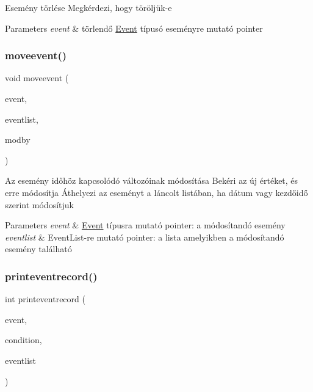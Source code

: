 Esemény törlése Megkérdezi, hogy töröljük-\/e 
\begin{DoxyParams}{Parameters}
{\em event} & törlendő \hyperlink{struct_event}{Event} típusó eseményre mutató pointer \\
\hline
\end{DoxyParams}
\mbox{\label{group__eventrecord_ga610dc34a1e251a16311ca7ac15f64e05}} 
\subsubsection{\texorpdfstring{moveevent()}{moveevent()}}
{\footnotesize\ttfamily void moveevent (\begin{DoxyParamCaption}\item[{\hyperlink{struct_event}{Event} $\ast$}]{event,  }\item[{\hyperlink{struct_event_list}{Event\+List} const $\ast$}]{eventlist,  }\item[{\hyperlink{group__eventrecord_ga643f8b09cbc45afc4ad36b27c077b1fd}{Mod\+By}}]{modby }\end{DoxyParamCaption})}

Az esemény időhöz kapcsolódó változóinak módosítása Bekéri az új értéket, és erre módosítja Áthelyezi az eseményt a láncolt listában, ha dátum vagy kezdőidő szerint módosítjuk 
\begin{DoxyParams}{Parameters}
{\em event} & \hyperlink{struct_event}{Event} típusra mutató pointer\+: a módosítandó esemény \\
\hline
{\em eventlist} & Event\+List-\/re mutató pointer\+: a lista amelyikben a módosítandó esemény található \\
\hline
\end{DoxyParams}
\mbox{\label{group__eventrecord_ga43a7dc247171d596d8d808776d8d40f5}} 
\subsubsection{\texorpdfstring{printeventrecord()}{printeventrecord()}}
{\footnotesize\ttfamily int printeventrecord (\begin{DoxyParamCaption}\item[{\hyperlink{struct_event}{Event} $\ast$}]{event,  }\item[{\hyperlink{struct_search_conditions}{Search\+Conditions}}]{condition,  }\item[{\hyperlink{struct_event_list}{Event\+List} $\ast$}]{eventlist }\end{DoxyParamCaption})}

